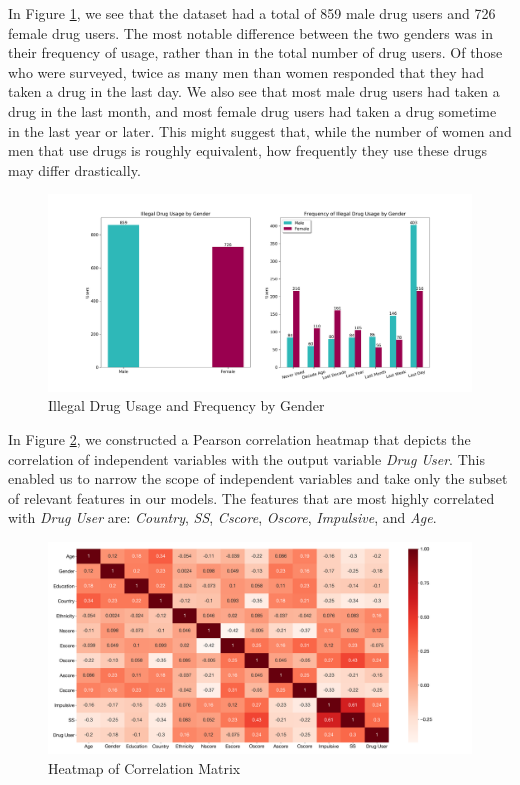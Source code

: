 \documentclass[10pt]{article}
\begin{document}
In Figure \ref{fig:genders}, we see that the dataset had a total of 859 male drug users and 726 female drug users. The most notable difference between the two genders was in their frequency of usage, rather than in the total number of drug users. Of those who were surveyed, twice as many men than women responded that they had taken a drug in the last day. We also see that most male drug users had taken a drug in the last month, and most female drug users had taken a drug sometime in the last year or later. This might suggest that, while the number of women and men that use drugs is roughly equivalent, how frequently they use these drugs may differ drastically.


\begin{figure}[H]
\caption{Illegal Drug Usage and Frequency by Gender}
\label{fig:genders}
\centering
\includegraphics[scale=0.45]{gender_freq.png}
\end{figure}

In Figure \ref{fig:heatmap}, we constructed a Pearson correlation heatmap that depicts the correlation of independent variables with the output variable \textit{Drug User}. This enabled us to narrow the scope of independent variables and take only the subset of relevant features in our models. The features that are most highly correlated with \textit{Drug User} are: \textit{Country}, \textit{SS}, \textit{Cscore}, \textit{Oscore}, \textit{Impulsive}, and \textit{Age}.


\begin{figure}[H]
\caption{Heatmap of Correlation Matrix}
\label{fig:heatmap}
\centering
\includegraphics[scale=0.25]{heatmap.png}
\end{figure}
\end{document}
